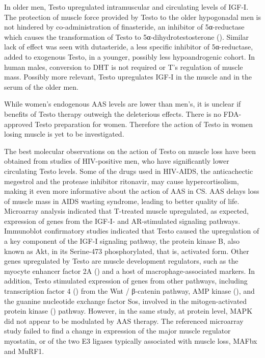 \documentclass[12pt,english]{report}\usepackage[]{graphicx}\usepackage[]{color}
\begin{document}
In older men, Testo upregulated intramuscular and circulating levels
of IGF-I\citep{ferrando2002testosterone,huang2005effects}. The protection
of muscle force provided by Testo to the older hypogonadal men is
not hindered by co-administration of finasteride, an inhibitor of
5α-reductase which causes the transformation of Testo to 5α-dihydrotestosterone
()\citep{borst2014musculoskeletal}.
Similar lack of effect was seen with dutasteride, a less specific
inhibitor of 5α-reductase, added to exogenous Testo, in a younger,
possibly less hypoandrogenic cohort\citep{bhasin2012effect}. In human
males, conversion to DHT is not required or T's regulation of muscle
mass. Possibly more relevant, Testo upregulates IGF-I in the muscle
and in the serum of the older men\citep{ferrando2002testosterone,huang2005effects}.

While women's endogenous AAS levels are lower than men's, it is unclear
if benefits of Testo therapy outweigh the deleterious effects\citep{traish2009testosterone,wierman2014androgen}.
There is no FDA-approved Testo preparation for women. Therefore the
action of Testo in women losing muscle is yet to be investigated.

The best molecular observations on the action of Testo on muscle loss
have been obtained from studies of HIV-positive men, who have significantly
lower circulating Testo levels\citep{croxson1989changes}. Some of
the drugs used in HIV-AIDS, the anticachectic megestrol and the protease
inhibitor ritonavir, may cause hypercortisolism, making it even more
informative about the action of AAS in CS. AAS delays loss of muscle
mass in AIDS wasting syndrome, leading to better quality of life\citep{grinspoon1998effects}.
Microarray analysis indicated that T-treated muscle upregulated, as
expected, expression of genes from the IGF-I- and AR-stimulated signaling
pathways\citep{montano2007transcriptional}. Immunoblot confirmatory
studies indicated that Testo caused the upregulation of a key component
of the IGF-I signaling pathway, the protein kinase B, also known as
Akt, in its Serine-473 phosphorylated, that is, activated form. Other
genes upregulated by Testo are muscle development regulators, such
as the myocyte enhancer factor 2A ()
and a host of macrophage-associated markers. In addition, Testo stimulated
expression of genes from other pathways, including transcription factor
4 () from the Wnt / β-catenin
pathway, AMP kinase (),
and the guanine nucleotide exchange factor Sos, involved in the mitogen-activated
protein kinase ()
pathway. However, in the same study, at protein level, MAPK did not
appear to be modulated by AAS therapy. The referenced microarray study
failed to find a change in expression of the major muscle regulator
myostatin\citep{mcpherron1997regulation,gonzalez-cadavid1998organization},
or of the two E3 ligases typically associated with muscle loss, MAFbx
and MuRF1\citep{bodine2001identification,gustafsson2010effects}.
\end{document}
